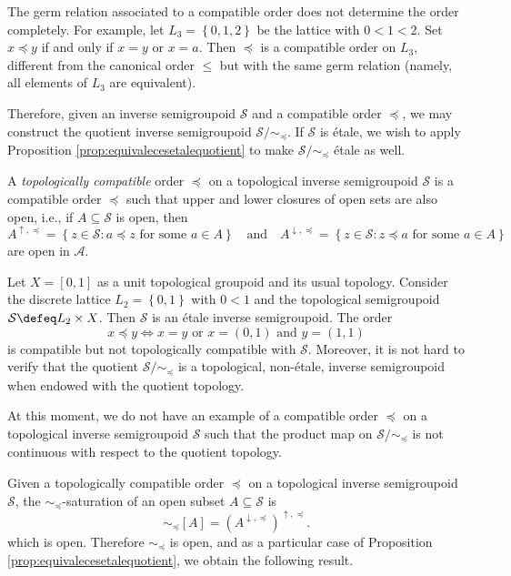 \begin{remark}
The germ relation associated to a compatible order does not determine the order completely. For example, let $L_3=\left\{0,1,2\right\}$ be the lattice with $0<1<2$. Set $x\preceq y$ if and only if $x=y$ or $x=a$. Then $\preceq$ is a compatible order on $L_3$, different from the canonical order $\leq$ but with the same germ relation (namely, all elements of $L_3$ are equivalent).
\end{remark}

Therefore, given an inverse semigroupoid $\mathcal{S}$ and a compatible order $\preceq$, we may construct the quotient inverse semigroupoid $\mathcal{S}/\!\!\sim_{\preceq}$. If $\mathcal{S}$ is étale, we wish to apply Proposition \ref{prop:equivalecesetalequotient} to make $\mathcal{S}/\!\!\sim_{\preceq}$ étale as well.

\begin{definition}
A \emph{topologically compatible} order $\preceq$ on a topological inverse semigroupoid $\mathcal{S}$ is a compatible order $\preceq$ such that upper and lower closures of open sets are also open, i.e., if $A\subseteq\mathcal{S}$ is open, then
\[A^{\uparrow,\preceq}=\left\{z\in\mathcal{S}:a\preceq z\text{ for some }a\in A\right\}\quad\text{and}\quad A^{\downarrow,\preceq}=\left\{z\in\mathcal{S}:z\preceq a\text{ for some }a\in A\right\}\]
are open in $\mathcal{A}$.
\end{definition}

\begin{example}
Let $X=[0,1]$ as a unit topological groupoid and its usual topology. Consider the discrete lattice $L_2=\left\{0,1\right\}$ with $0<1$ and the topological semigroupoid $\mathcal{S}\defeq L_2\times X$. Then $\mathcal{S}$ is an étale inverse semigroupoid. The order
\[x\preceq y\iff x=y\text{ or }x=(0,1)\text{ and }y=(1,1)\]
is compatible but not topologically compatible with $\mathcal{S}$. Moreover, it is not hard to verify that the quotient $\mathcal{S}/\!\!\sim_{\preceq}$ is a topological, non-étale, inverse semigroupoid when endowed with the quotient topology.
\end{example}

At this moment, we do not have an example of a compatible order $\preceq$ on a topological inverse semigroupoid $\mathcal{S}$ such that the product map on $\mathcal{S}/\!\!\sim_{\preceq}$ is not continuous with respect to the quotient topology.

Given a topologically compatible order $\preceq$ on a topological inverse semigroupoid $\mathcal{S}$, the $\sim_{\preceq}$-saturation of an open subset $A\subseteq\mathcal{S}$ is
\[\sim_{\preceq}[A]=(A^{\downarrow,\preceq})^{\uparrow,\preceq}.\]
which is open. Therefore $\sim_{\preceq}$ is open, and as a particular case of Proposition \ref{prop:equivalecesetalequotient}, we obtain the following result.

